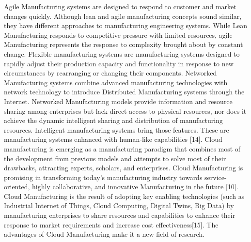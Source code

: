Agile Manufacturing systems are designed to respond to customer and market changes quickly. Although lean and agile manufacturing concepts sound similar, they have different approaches to manufacturing engineering systems. While Lean Manufacturing responds to competitive pressure with limited resources, agile Manufacturing represents the response to complexity brought about by constant change. Flexible manufacturing systems are manufacturing systems designed to rapidly adjust their production capacity and functionality in response to new circumstances by rearranging or changing their components. Networked Manufacturing systems combine advanced manufacturing technologies with network technology to introduce Distributed Manufacturing systems through the Internet. Networked Manufacturing models provide information and resource sharing among enterprises but lack direct access to physical resources, nor does it achieve the dynamic intelligent sharing and distribution of manufacturing resources. Intelligent manufacturing systems bring those features. These are manufacturing systems enhanced with human-like capabilities [14]. Cloud manufacturing is emerging as a manufacturing paradigm that combines most of the development from previous models and attempts to solve most of their drawbacks, attracting experts, scholars, and enterprises. Cloud Manufacturing is promising in transforming today’s manufacturing industry towards service-oriented, highly collaborative, and innovative Manufacturing in the future [10]. Cloud Manufacturing is the result of adopting key enabling technologies (such as Industrial Internet of Things, Cloud Computing, Digital Twins, Big Data) by manufacturing enterprises to share resources and capabilities to enhance their response to market requirements and increase cost effectiveness[15]. The advantages of Cloud Manufacturing make it a new field of research.

